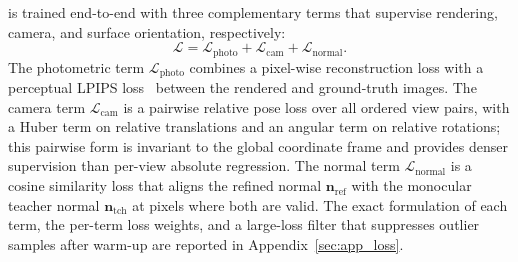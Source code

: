 \method is trained end-to-end with three complementary terms that supervise rendering, camera, and surface orientation, respectively:
\begin{equation}
    \mathcal{L} = \mathcal{L}_{\mathrm{photo}} + \mathcal{L}_{\mathrm{cam}} + \mathcal{L}_{\mathrm{normal}}.
    \label{eq:total}
\end{equation}
The photometric term $\mathcal{L}_{\mathrm{photo}}$ combines a pixel-wise reconstruction loss with a perceptual LPIPS loss~\citep{zhang2018unreasonable} between the rendered and ground-truth images. The camera term $\mathcal{L}_{\mathrm{cam}}$ is a pairwise relative pose loss over all ordered view pairs, with a Huber term on relative translations and an angular term on relative rotations; this pairwise form is invariant to the global coordinate frame and provides denser supervision than per-view absolute regression. The normal term $\mathcal{L}_{\mathrm{normal}}$ is a cosine similarity loss that aligns the refined normal $\mathbf{n}_{\mathrm{ref}}$ with the monocular teacher normal $\mathbf{n}_{\mathrm{tch}}$ at pixels where both are valid. The exact formulation of each term, the per-term loss weights, and a large-loss filter that suppresses outlier samples after warm-up are reported in Appendix~\ref{sec:app_loss}.

